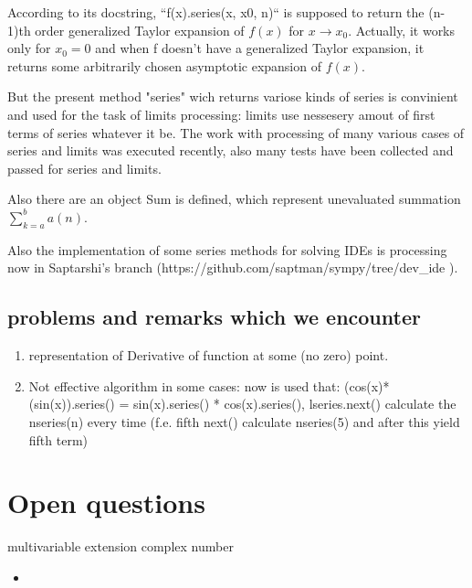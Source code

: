\documentclass[a4paper]{article}
\begin{document}
According to its docstring, ``f(x).series(x, x0, n)`` is supposed to return the (n-1)th order generalized Taylor expansion of $f(x)$ for $x \rightarrow x_0$.
Actually, it works only for $x_0 = 0$ and when f doesn't have a generalized Taylor expansion, it returns some arbitrarily chosen asymptotic expansion of $f(x)$.

But the present method "series" wich returns variose kinds of series is convinient and used for the task of limits processing: limits use nessesery amout of first terms of series whatever it be.
The work with processing of many various cases of series and limits was executed recently, also many tests have been collected and passed for series and limits.


Also there are an object Sum is defined, which represent unevaluated summation $\sum_{k=a}^b a(n) $.


Also the implementation of some series methods for solving IDEs is processing now in Saptarshi's branch (https://github.com/saptman/sympy/tree/dev_ide
).

\subsection{problems and remarks which we encounter}
    \begin{enumerate}
        \item representation of Derivative of function at some (no zero) point.
        \item Not effective algorithm in some cases: now is used that: (cos(x)*(sin(x)).series() = sin(x).series() * cos(x).series(), lseries.next() calculate the nseries(n)  every time  (f.e. fifth next() calculate nseries(5) and after this yield fifth term)
    \end{enumerate}

\section{Open questions}
    \begin{enumerate}
        multivariable extension
        complex number
    \end{enumerate}
\begin{itemize}
	\item 
\end{itemize}
\end{document}
